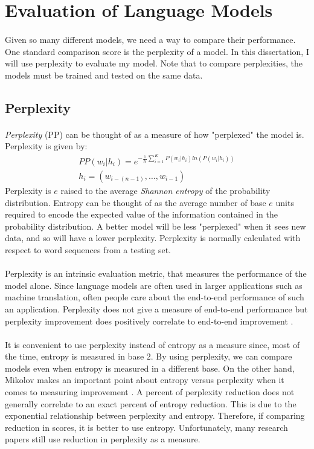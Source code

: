 \section {Evaluation of Language Models}
\paragraph{}
Given so many different models, we need a way to compare their performance. One standard comparison score is the perplexity of a model. In this dissertation, I will use perplexity to evaluate my model. Note that to compare perplexities, the models must be trained and tested on the same data.
\subsection{Perplexity}
\paragraph{}
\emph{Perplexity} (PP) can be thought of as a measure of how "perplexed" the model is.
Perplexity is given by:
\begin{align}
PP(w_i | h_i)=e^{- \frac{1}{K} \sum_{i=1}^K P(w_i | h_i ) ln( P(w_i | h_i) ) } 
\\ h_i = ( w_{i-(n-1)},\dots, w_{i-1} )
\end{align}
Perplexity is $e$ raised to the average \emph{Shannon entropy} of the probability distribution. Entropy can be thought of as the average number of base $e$ units required to encode the expected value of the information contained in the probability distribution. A better model will be less "perplexed" when it sees new data, and so will have a lower perplexity.  Perplexity is normally calculated with respect to word sequences from a testing set. 
\paragraph{}
Perplexity is an intrinsic evaluation metric, that measures the performance of the model alone. Since language models are often used in larger applications such as machine translation, often people care about the end-to-end performance of such an application. Perplexity does not give a measure of end-to-end performance but perplexity improvement does positively correlate to end-to-end improvement \cite{Jurafsky2009}.
\paragraph{}
It is convenient to use perplexity instead of entropy as a measure since, most of the time, entropy is measured in base $2$. By using perplexity, we can compare models even when entropy is measured in a different base. On the other hand, Mikolov makes an important point about entropy versus perplexity when it comes to measuring improvement \cite{Mikolov2012}. A percent of perplexity reduction does not generally correlate to an exact percent of entropy reduction. This is due to the exponential relationship between perplexity and entropy. Therefore, if comparing reduction in scores, it is better to use entropy. Unfortunately, many research papers still use reduction in perplexity as a measure.

